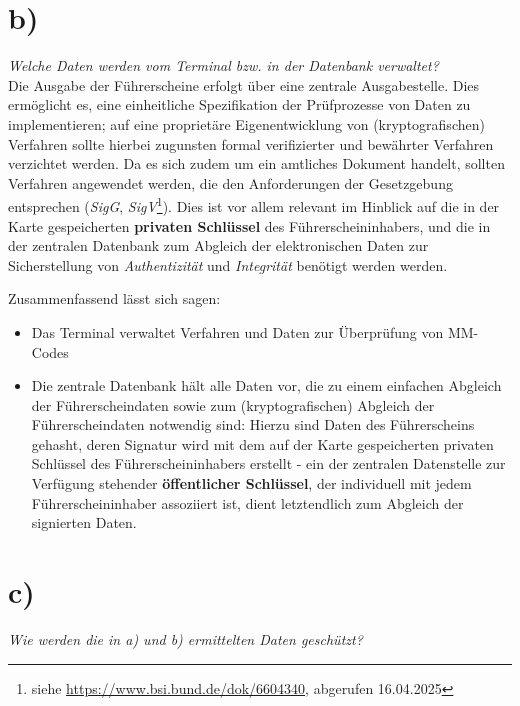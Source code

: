 \section{b)}

\textit{Welche Daten werden vom Terminal bzw. in der Datenbank verwaltet?}\\

\noindent
Die Ausgabe der Führerscheine erfolgt über eine zentrale Ausgabestelle.
Dies ermöglicht es, eine einheitliche Spezifikation der Prüfprozesse von Daten zu implementieren; auf eine proprietäre Eigenentwicklung von (kryptografischen) Verfahren sollte hierbei zugunsten formal verifizierter und bewährter Verfahren verzichtet werden.
Da es sich zudem um ein amtliches Dokument handelt, sollten Verfahren angewendet werden, die den Anforderungen der Gesetzgebung entsprechen (\textit{SigG}, \textit{SigV}\footnote{
siehe \url{https://www.bsi.bund.de/dok/6604340}, abgerufen 16.04.2025
}).
Dies ist vor allem relevant im Hinblick auf die in der Karte gespeicherten \textbf{privaten Schlüssel} des Führerscheininhabers, und die in der zentralen Datenbank zum Abgleich der elektronischen Daten zur Sicherstellung von \textit{Authentizität} und \textit{Integrität} benötigt werden werden.

Zusammenfassend lässt sich sagen:

\begin{itemize}
    \itemsep0.5em
    \item Das Terminal verwaltet Verfahren und Daten zur Überprüfung von MM-Codes
    \item Die zentrale Datenbank hält alle Daten vor, die zu einem einfachen Abgleich der Führerscheindaten sowie zum (kryptografischen) Abgleich der Führerscheindaten notwendig sind: Hierzu sind Daten des Führerscheins gehasht, deren Signatur wird mit dem auf der Karte gespeicherten privaten Schlüssel des Führerscheininhabers erstellt - ein der zentralen Datenstelle zur Verfügung stehender \textbf{öffentlicher Schlüssel}, der individuell mit jedem Führerscheininhaber assoziiert ist, dient letztendlich zum Abgleich der signierten Daten.
\end{itemize}


\section{c)}

\textit{Wie werden die in a) und b) ermittelten Daten geschützt?}\\

